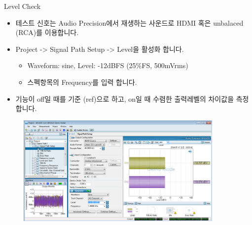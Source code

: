 \documentclass{beamer}
\begin{document}
\begin{frame}[t]{Level Check}
\begin{itemize}
\item 테스트 신호는 Audio Precision에서 재생하는 사운드로 HDMI 혹은 unbalaced (RCA)를 이용합니다.
\item Project -> Signal Path Setup -> Level을 활성화 합니다.
	\begin{itemize}
	\item Waveform: sine, Level: -12dBFS (25\%FS, 500mVrms)
	\item 스펙항목의 Frequency를 입력 합니다.
	\end{itemize}
\item 기능이 off일 때를 기준 (ref)으로 하고, on일 때 수렴한 출력레벨의 차이값을 측정합니다.
\end{itemize}

\begin{figure}[b]
\includegraphics[width=0.9\textwidth]{figure/apsetting/level.png}
\end{figure}

\end{frame}
\end{document}
